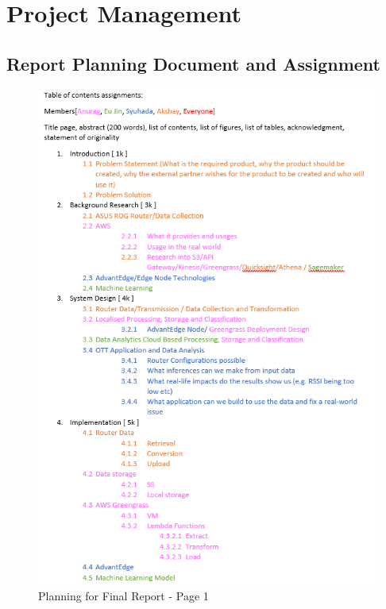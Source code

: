 \chapter{Project Management}
\label{appendix:project_management}
\section{Report Planning Document and Assignment}
\label{appendix:report_planning}
\begin{figure}[ht]
    \centering
    \includegraphics[width=1\linewidth]{images/report_plan/pg_1.png}
    \caption{Planning for Final Report - Page 1}
    \label{fig:report_plan1}
\end{figure}

